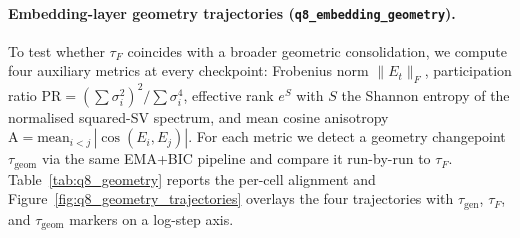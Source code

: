 \documentclass{article}
\newcommand{\taug}{\tau_{\mathrm{gen}}}
\newcommand{\tauf}{\tau_{F}}
\begin{document}
\paragraph{Embedding-layer geometry trajectories (\texttt{q8\_embedding\_geometry}).}
To test whether $\tauf$ coincides with a broader geometric
consolidation, we compute four auxiliary metrics at every
checkpoint:
Frobenius norm $\|E_t\|_F$,
participation ratio
$\mathrm{PR}=(\sum\sigma_i^2)^2 / \sum\sigma_i^4$,
effective rank $e^{S}$ with $S$ the Shannon entropy of the
normalised squared-SV spectrum, and
mean cosine anisotropy
$\mathrm{A}=\mathrm{mean}_{i<j}\,|\cos(E_i,E_j)|$.
For each metric we detect a geometry changepoint $\tau_{\mathrm{geom}}$
via the same EMA+BIC pipeline and compare it run-by-run to $\tauf$.
Table~\ref{tab:q8_geometry} reports the per-cell alignment and
Figure~\ref{fig:q8_geometry_trajectories} overlays the four
trajectories with $\taug$, $\tauf$, and $\tau_{\mathrm{geom}}$
markers on a log-step axis.
\end{document}
